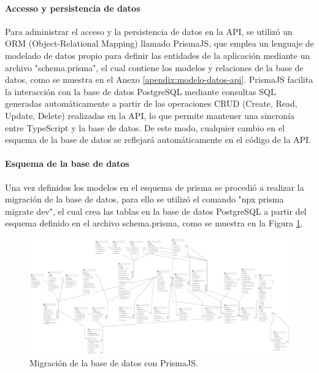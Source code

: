 \paragraph{Accesso y persistencia de datos}
Para administrar el acceso y la persistencia de datos en la API, se utilizó un ORM (Object-Relational Mapping) llamado PrismaJS, que
emplea un lenguaje de modelado de datos propio para definir las entidades de la aplicación mediante un archivo "schema.prisma", el cual
contiene los modelos y relaciones de la base de datos, como se muestra en el Anexo \ref{apendix:modelo-datos-api}. PrismaJS facilita
la interacción con la base de datos PostgreSQL mediante consultas SQL generadas automáticamente a partir de las operaciones CRUD (Create,
Read, Update, Delete) realizadas en la API, lo que permite mantener una sincronía entre TypeScript y la base de datos. De este modo,
cualquier cambio en el esquema de la base de datos se reflejará automáticamente en el código de la API.

\paragraph{Esquema de la base de datos}
Una vez definidos los modelos en el esquema de prisma se procedió a realizar la migración de la base de datos, para ello se utilizó el
comando "npx prisma migrate dev", el cual crea las tablas en la base de datos PostgreSQL a partir del esquema definido
en el archivo schema.prisma, como se muestra en la Figura \ref{fig:migracion-base-datos}.

\begin{landscape}
    \begin{figure}[H]
        \centering
        \includegraphics[width=1.7\textwidth]{chapters/III-resultados-y-discusion/resources/images/migracion-base-datos.png}
        \caption{Migración de la base de datos con PrismaJS.}
        \label{fig:migracion-base-datos}
    \end{figure}
\end{landscape}

